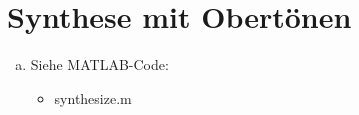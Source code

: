 \chapter{Synthese mit Obertönen}


\begin{enumerate}[a)]
\item
Siehe MATLAB-Code:
\begin{itemize}
\item
synthesize.m
\end{itemize}
\end{enumerate}
